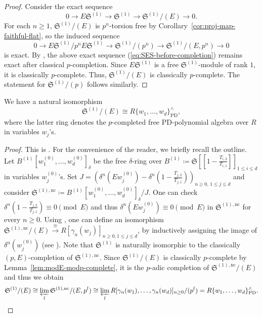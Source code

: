 \begin{proof}
Consider the exact sequence
\begin{equation} \label{eq:SES-before-completion}
0 \rightarrow E\mathfrak{S}^{(1)} \rightarrow \mathfrak{S}^{(1)} \rightarrow \mathfrak{S}^{(1)}/(E) \rightarrow 0.   
\end{equation}
For each $n \geq 1$, $\mathfrak{S}^{(1)}/(E)$ is $p^n$-torsion free by Corollary~\ref{cor:proj-map-faithful-flat}, so the induced sequence
\[
0 \rightarrow E\mathfrak{S}^{(1)}/p^n E\mathfrak{S}^{(1)} \rightarrow \mathfrak{S}^{(1)}/(p^n) \rightarrow \mathfrak{S}^{(1)}/(E, p^n) \rightarrow 0
\]
is exact. By \cite[Tag~03CA]{stacks-project}, the above exact sequence (\ref{eq:SES-before-completion}) remains exact after classical $p$-completion. Since $E\mathfrak{S}^{(1)}$ is a free $\mathfrak{S}^{(1)}$-module of rank $1$, it is classically $p$-complete. Thus, $\mathfrak{S}^{(1)}/(E)$ is classically $p$-complete.
The statement for $\mathfrak{S}^{(1)}/(p)$ follows similarly.
\end{proof}


\begin{prop} \label{prop:frakS^(1)/E}
We have a natural isomorphism
\[
\mathfrak{S}^{(1)}/(E) \cong R \{w_1,\ldots,w_d\}^\wedge_\mathrm{PD},
\]
where the latter ring denotes the $p$-completed free PD-polynomial algebra over $R$ in variables $w_j$'s.
\end{prop}

\begin{proof}
This is \cite[Prop.~2.2.8(2)]{du-liu-prismaticphiGhatmodule}. For the convenience of the reader, we briefly recall the outline. Let $B^{(1)}[w_1^{(0)},\ldots,w_d^{(0)}]_{\delta}$ be the free $\delta$-ring over $B^{(1)}\coloneqq \mathfrak{S}[\![1-\frac{T_{i, 2}}{T_{i, 1}}]\!]_{1\leq i \leq d}$ in variables $w_j^{(0)}$'s. Set $J = (\delta^n(Ew_j^{(0)})-\delta^n(1-\frac{T_{j, 2}}{T_{j, 1}}))_{n \geq 0,\,1\leq j \leq d}$ and consider $\mathfrak{S}^{(1), \mathrm{nc}} \coloneqq B^{(1)}[w_1^{(0)},\ldots,w_d^{(0)}]_{\delta} / J$. One can check $\delta^n(1-\frac{T_{j, 2}}{T_{j, 1}}) \equiv 0 \pmod E$ and thus $\delta^n(Ew_j^{(0)}) \equiv 0 \pmod E$ in $\mathfrak{S}^{(1), \mathrm{nc}}$ for every $n\geq 0$. Using \cite[Lem.~2.2.5]{du-liu-prismaticphiGhatmodule}, one can define an isomorphism $\mathfrak{S}^{(1), \mathrm{nc}}/(E)\xrightarrow{\cong} R[\gamma_n(w_j)]_{n \geq 0, 1 \leq j \leq d}$, by inductively assigning the image of $\delta^n(w_j^{(0)})$ (see \cite[Prop.~2.2.8(1)]{du-liu-prismaticphiGhatmodule}).
Note that $\mathfrak{S}^{(1)}$ is naturally isomorphic to the classically $(p, E)$-completion of $\mathfrak{S}^{(1), \mathrm{nc}}$. Since $\mathfrak{S}^{(1)}/(E)$ is classically $p$-complete by Lemma~\ref{lem:modE-modp-complete}, it is the $p$-adic completion of $\mathfrak{S}^{(1), \mathrm{nc}}/(E)$ and thus we obtain
\[
\mathfrak{S}^{(1)}/(E) \cong 
 \varprojlim_{l} \mathfrak{S}^{(1), \mathrm{nc}}/(E, p^{l})\cong \varprojlim_{l} R[\gamma_n(w_1),\ldots, \gamma_n(w_d)]_{n \geq 0}/(p^{l}) = R \{w_1,\ldots, w_d \}^\wedge_\mathrm{PD}.    
\]
\end{proof}


